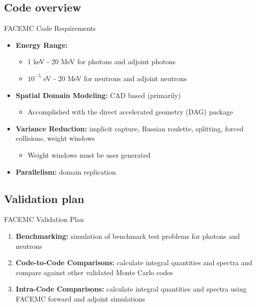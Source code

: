 \documentclass{beamer}
\begin{document}
\subsection{Code overview}
\begin{frame}{FACEMC Code Requirements}


  \begin{itemize}
    \item \textbf{Energy Range:}
      \begin{itemize}
        \item 1 keV - 20 MeV for photons and adjoint photons
        \item $10^{-5}$ eV - 20 MeV for neutrons and adjoint neutrons
          \bigskip
      \end{itemize}
    \item \textbf{Spatial Domain Modeling:} CAD based (primarily)
      \begin{itemize}
        \item Accomplished with the direct accelerated geometry (DAG) package
      \end{itemize}
      \bigskip
    \item \textbf{Variance Reduction:} implicit capture, Russian roulette,
      splitting, forced collisions, weight windows
      \begin{itemize}
        \item Weight windows must be user generated
      \end{itemize}
      \bigskip
    \item \textbf{Parallelism:} domain replication
  \end{itemize}

\end{frame}

\subsection{Validation plan}
\begin{frame}{FACEMC Validation Plan}

      \begin{enumerate}
        \item \textbf{Benchmarking:} simulation of benchmark test problems for 
          photons and neutrons
          \bigskip
          \bigskip
        \item \textbf{Code-to-Code Comparisons:} calculate integral quantities 
          and spectra and compare against other validated Monte Carlo codes 
          \bigskip
          \bigskip
        \item \textbf{Intra-Code Comparisons:} calculate integral quantities 
          and spectra using FACEMC forward and adjoint simulations
      \end{enumerate}
    
\end{frame}
\end{document}

